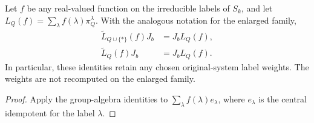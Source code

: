 \begin{theorem}
    \label{thm:added_site_tensor_insertion_label_observables}
    \leanok
    Let $f$ be any real-valued function on the irreducible labels of $S_k$,
    and let $L_Q(f)=\sum_\lambda f(\lambda)\pi_Q^\lambda$.
    With the analogous notation for the enlarged family,
    \begin{align*}
        \widetilde L_{Q\cup\{*\}}(f)J_b&=J_bL_Q(f),\\
        \widetilde L_Q(f)J_b&=J_bL_Q(f).
    \end{align*}
    In particular, these identities retain any chosen original-system
    label weights. The weights are not recomputed on the enlarged family.
\end{theorem}
\begin{proof}
    \leanok
    Apply the group-algebra identities to
    $\sum_\lambda f(\lambda)e_\lambda$, where $e_\lambda$ is the central
    idempotent for the label $\lambda$.
\end{proof}
